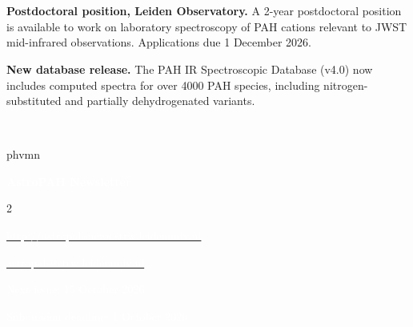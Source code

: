 \documentclass{astropah}
\newcommand{\nextissue}{15 October 2026}
\newcommand{\nextdeadline}{1 October 2026}
\begin{document}
\section*{~}
\normalsize

\textbf{Postdoctoral position, Leiden Observatory.} A 2-year postdoctoral
position is available to work on laboratory spectroscopy of PAH cations
relevant to JWST mid-infrared observations. Applications due 1 December
2026.

\textbf{New database release.} The PAH IR Spectroscopic Database (v4.0)
now includes computed spectra for over 4000 PAH species, including
nitrogen-substituted and partially dehydrogenated variants.

\textcolor{white}{.}
\vfill

\begin{shaded}
 {phv}{m}{n}
\fontsize{15}{16}
\selectfont

\centerline{\textbf{\textcolor{white}{AstroPAH Newsletter}}}

\begin{multicols}{2}
\normalsize

\noindent \href{http://astropah-news.strw.leidenuniv.nl}{\textcolor{white}{http://astropah-news.strw.leidenuniv.nl}}

\noindent \href{mailto:astropah@strw.leidenuniv.nl}{\textcolor{white}{astropah@strw.leidenuniv.nl}}

\columnbreak

\flushright \textcolor{white}{Next issue: \nextissue}

\textcolor{white}{Submission deadline: \nextdeadline}

\end{multicols}
\end{shaded}
\end{document}
